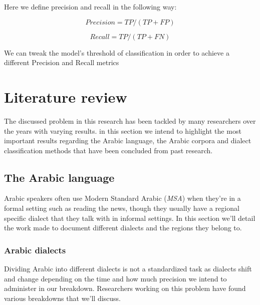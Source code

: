 \documentclass[12pt]{diazessay}
\begin{document}
    Here we define precision and recall in the following way:
    
    \[Precision = TP / (TP + FP)\]
    
    \[Recall = TP / (TP + FN)\]
    
    We can tweak the model's threshold of classification in order to achieve a different Precision and Recall metrics


\section{Literature review}
The discussed problem in this research has been tackled by many researchers over the years with varying results. in this section we intend to highlight the most important results regarding the Arabic language, the Arabic corpora and dialect classification methods that have been concluded from past research.
    
    
    \subsection{The Arabic language} \label{txt:thearabiclanguage}
    Arabic speakers often use Modern Standard Arabic (\emph{MSA}) when they're in a formal setting such as reading the news, though they usually have a regional specific dialect that they talk with in informal settings. In this section we'll detail the work made to document different dialects and the regions they belong to. 
        
        
        \subsubsection{Arabic dialects}
        Dividing Arabic into different dialects is not a standardized task as dialects shift and change depending on the time and how much precision we intend to administer in our breakdown. Researchers working on this problem have found various breakdowns that we'll discuss.
        
\end{document}
